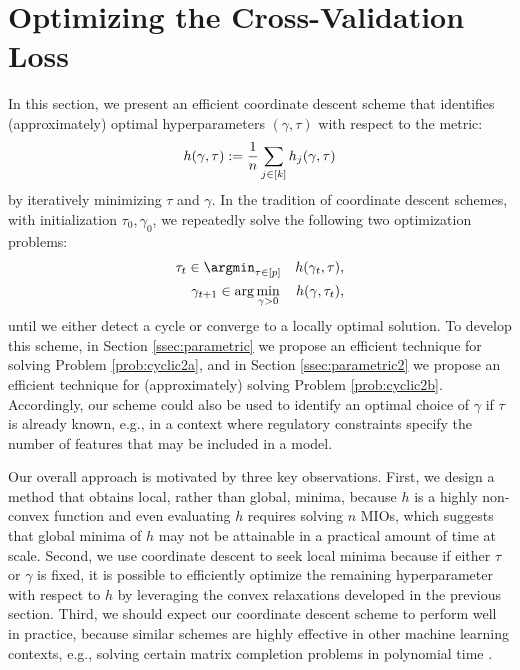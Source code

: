 \documentclass[ijoc,noblindrev]{informs3} %
\begin{document}
\section{Optimizing the Cross-Validation Loss}\label{sec:corddescent}
In this section, we present an efficient coordinate descent scheme that identifies (approximately) optimal hyperparameters $(\gamma, \tau)$ with respect to the metric: 
\begin{equation}\label{prob:cyclic1}\color{black}
	h(\gamma, \tau):= \frac{1}{n} \sum_{j \in [k]} h_j(\gamma, \tau)
\end{equation}
by iteratively minimizing $\tau$ and $\gamma$. In the tradition of coordinate descent schemes, with initialization $\tau_0, \gamma_0$, we repeatedly solve the following two optimization problems:
\begin{align}\label{prob:cyclic2a}
    \tau_t \in \argmin_{\tau \in[p]} \quad h(\gamma_t, \tau),\\
    \gamma_{t+1} \in \arg \min_{\gamma >0 } \quad h(\gamma, \tau_t),\label{prob:cyclic2b}
\end{align}
until we either detect a cycle or converge to a locally optimal solution. To develop this scheme, in Section \ref{ssec:parametric} we propose an efficient technique for solving Problem {\color{black}\eqref{prob:cyclic2a}}, %
and in Section \ref{ssec:parametric2} we propose an efficient technique for (approximately) solving Problem {\color{black}\eqref{prob:cyclic2b}}. Accordingly, our scheme could also be used to identify an optimal choice of $\gamma$ if $\tau$ is already known, e.g., in a context where regulatory constraints specify the number of features that may be included in a model. 

Our overall approach is motivated by three key observations. First, we design a method that obtains local, rather than global, minima, because $h$ is a highly non-convex function and even evaluating $h$ requires solving $n$ MIOs, which suggests that global minima of $h$ may not be attainable in a practical amount of time at scale. Second, we use coordinate descent to seek local minima because if either $\tau$ or $\gamma$ is fixed, it is possible to efficiently optimize the remaining hyperparameter with respect to $h$ by leveraging the convex relaxations developed in the previous section. Third, we should expect our coordinate descent scheme to perform well in practice, because similar schemes are highly effective in other machine learning contexts, e.g., solving certain matrix completion problems in polynomial time \citep{mazumder2011sparsenet, cifuentes2022polynomial}.
\end{document}
